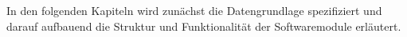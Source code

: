 
In den folgenden Kapiteln wird zunächst die Datengrundlage spezifiziert und darauf aufbauend die Struktur und Funktionalität der Softwaremodule erläutert.



\prever{
}




\prever{
}
